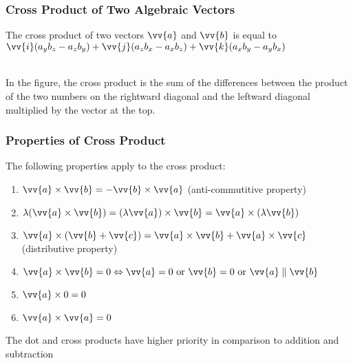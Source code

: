 \documentclass{article}
\begin{document}
	\subsubsection{Cross Product of Two Algebraic Vectors}
	The cross product of two vectors $\vv{a}$ and $\vv{b}$ is equal to $\vv{i}(a_yb_z-a_zb_y)+\vv{j}(a_zb_x-a_xb_z)+\vv{k}(a_xb_y-a_yb_x)$\\
	\\
	In the figure, the cross product is the sum of the differences between the product of the two numbers on the rightward diagonal and the leftward diagonal multiplied by the vector at the top.
	\subsubsection{Properties of Cross Product}
	The following properties apply to the cross product:
	\begin{enumerate}
		\item $\vv{a}\times\vv{b}=-\vv{b}\times\vv{a}$ (anti-commutitive property)
		\item $\lambda(\vv{a}\times\vv{b})=(\lambda\vv{a})\times\vv{b}=\vv{a}\times(\lambda\vv{b})$
		\item $\vv{a}\times(\vv{b}+\vv{c})=\vv{a}\times\vv{b}+\vv{a}\times\vv{c}$ (distributive property)
		\item $\vv{a}\times\vv{b}=0\Leftrightarrow\vv{a}=0\text{ or }\vv{b}=0\text{ or }\vv{a}\parallel\vv{b}$
		\item $\vv{a}\times0=0$
		\item $\vv{a}\times\vv{a}=0$
	\end{enumerate}
	The dot and cross products have higher priority in comparison to addition and subtraction
\end{document}
